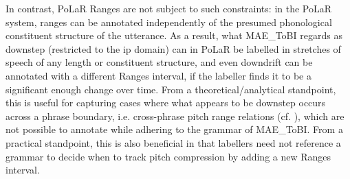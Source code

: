 \documentclass[11pt, twoside]{memoir}
\begin{document}
In contrast, PoLaR Ranges are not subject to such constraints: in the PoLaR system, ranges can be annotated independently of the presumed phonological constituent structure of the utterance. As a result, what MAE\_ToBI regards as downstep (restricted to the ip domain) can in PoLaR be labelled in stretches of speech of any length or constituent structure, and even downdrift can be annotated with a different Ranges interval, if the labeller finds it to be a significant enough change over time. From a theoretical\slash analytical standpoint, this is useful for capturing cases where what appears to be downstep occurs across a phrase boundary, i.e. cross-phrase pitch range relations (cf. \citealt{ladd88, brugos15}), which are not possible to annotate while adhering to the grammar of MAE\_ToBI. From a practical standpoint, this is also beneficial in that labellers need not reference a grammar to decide when to track pitch compression by adding a new Ranges interval.
\end{document}

